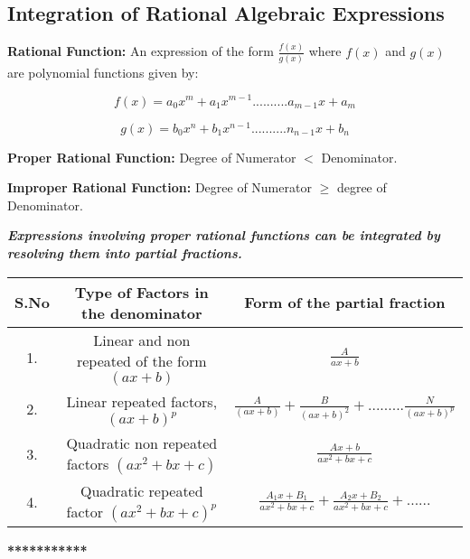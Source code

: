 \subsection{Integration of Rational Algebraic Expressions}
\textbf{Rational Function:} An expression of the form $\frac{f(x)}{g(x)}$ where $f(x)$ and $g(x)$ are polynomial functions given by:

\vspace{-3mm}

\[ f(x) = a_0x^m + a_1x^{m-1}..........a_{m-1}x + a_m \] 

\vspace{-5mm}

\[ g(x) = b_0x^n + b_1x^{n-1}..........n_{n-1}x + b_n \]

\noindent
\textbf{Proper Rational Function:} Degree of Numerator $<$ Denominator.

\vspace{2mm}

\noindent
\textbf{Improper Rational Function:} Degree of Numerator $ \geq $ degree of Denominator.

\vspace{3mm}

\noindent
\textbf{\textit{Expressions involving proper rational functions can be integrated by resolving them into partial fractions.}}

\vspace{5mm}

\noindent
\begin{center}
\begin{tabular}{|c|c|c|}
\hline 
S.No & Type of Factors in the denominator & Form of the partial fraction \\ 
\hline 
1. & Linear and non repeated of the form $ (ax+b) $ & $ \frac{A}{ax+b} $ \\ 
\hline 
2. & Linear repeated factors, $ (ax+b)^p $ & $\frac{A}{(ax+b)} + \frac{B}{(ax+b)^2}+.........\frac{N}{(ax+b)^p} $ \\ 
\hline 
3. & Quadratic non repeated factors $ (ax^2 + bx +c ) $ & $\frac{Ax+b}{ax^2+bx+c} $ \\ 
\hline 
4. & Quadratic repeated factor $ (ax^2+bx+c)^p $ & $ \frac{A_1x+B_1}{ax^2+bx+c} + \frac{A_2x+B_2}{ax^2+bx+c}+...... $ \\
\hline 
\end{tabular} 
\end{center}


\vspace{5mm}
\begin{center}
\textbf{***********}
\end{center}